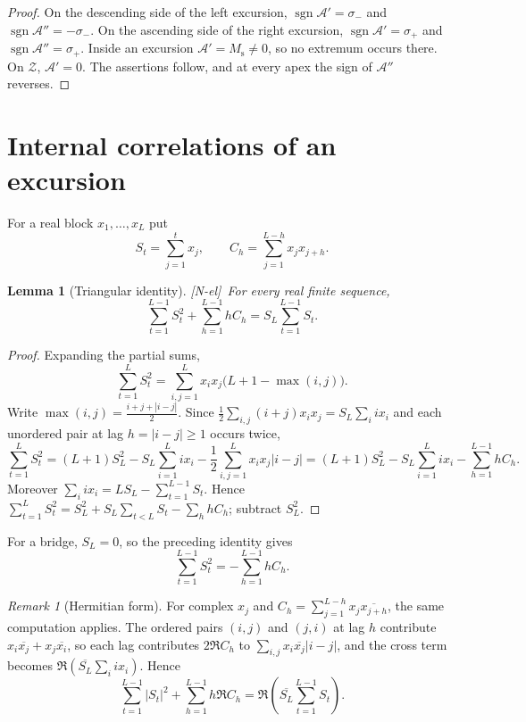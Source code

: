 \documentclass[11pt]{amsart}
\numberwithin{equation}{section}
\theoremstyle{plain}
\newtheorem{lemma}[theorem]{Lemma}
\theoremstyle{definition}
\theoremstyle{remark}
\newtheorem{remark}[theorem]{Remark}
\DeclareMathOperator{\sgn}{sgn}
\newcommand{\Ms}{M_{\mathrm{s}}}
\newcommand{\Anet}{\mathcal{A}}
\newcommand{\tagNE}{\textup{[N-el]}}
\begin{document}
\begin{proof}
On the descending side of the left excursion,
$\sgn\Anet'=\sigma_-$ and $\sgn\Anet''=-\sigma_-$. On the ascending side of
the right excursion, $\sgn\Anet'=\sigma_+$ and $\sgn\Anet''=\sigma_+$. Inside an excursion
$\Anet'=\Ms\ne0$, so no extremum occurs there. On
$\mathcal Z$, $\Anet'=0$. The assertions follow, and at every apex the sign of
$\Anet''$ reverses.
\end{proof}


\section{Internal correlations of an excursion}
\label{sec:internal_corr}

For a real block $x_1,\dots,x_L$ put
\begin{equation}
\label{eq:block_def}
S_t=\sum_{j=1}^t x_j,\qquad
C_h=\sum_{j=1}^{L-h}x_jx_{j+h}.
\end{equation}

\begin{lemma}[Triangular identity]
\label{lem:triangular-corr}
\tagNE\ For every real finite sequence,
\begin{equation}
\label{eq:general-triangular}
\sum_{t=1}^{L-1}S_t^2+\sum_{h=1}^{L-1}hC_h
=S_L\sum_{t=1}^{L-1}S_t.
\end{equation}
\end{lemma}

\begin{proof}
Expanding the partial sums,
\[
\sum_{t=1}^{L}S_t^2
=\sum_{i,j=1}^{L}x_ix_j\bigl(L+1-\max(i,j)\bigr).
\]
Write $\max(i,j)=\frac{i+j+|i-j|}{2}$. Since
$\frac12\sum_{i,j}(i+j)x_ix_j=S_L\sum_i ix_i$ and each unordered pair at
lag $h=|i-j|\ge1$ occurs twice,
\[
\sum_{t=1}^{L}S_t^2=(L+1)S_L^2-S_L\sum_{i=1}^{L}ix_i
-\frac12\sum_{i,j=1}^{L}x_ix_j|i-j|
=(L+1)S_L^2-S_L\sum_{i=1}^{L}ix_i-\sum_{h=1}^{L-1}hC_h .
\]
Moreover $\sum_i ix_i=LS_L-\sum_{t=1}^{L-1}S_t$.
Hence
$\sum_{t=1}^{L}S_t^2=S_L^2+S_L\sum_{t<L}S_t-\sum_hhC_h$; subtract $S_L^2$.
\end{proof}

For a bridge, $S_L=0$, so the preceding identity gives
\begin{equation}
\label{eq:bridge-triangular}
\sum_{t=1}^{L-1}S_t^2=-\sum_{h=1}^{L-1}hC_h.
\end{equation}

\begin{remark}[Hermitian form]
\label{rem:hermitian}
For complex $x_j$ and $C_h=\sum_{j=1}^{L-h}x_j\overline{x_{j+h}}$, the same
computation applies. The ordered pairs $(i,j)$ and $(j,i)$ at lag $h$
contribute $x_i\overline{x_j}+x_j\overline{x_i}$, so each lag contributes
$2\Re C_h$ to $\sum_{i,j}x_i\overline{x_j}|i-j|$, and the cross term
becomes $\Re(\overline{S_L}\sum_i ix_i)$. Hence
\[
\sum_{t=1}^{L-1}|S_t|^2+\sum_{h=1}^{L-1}h\Re C_h
=\Re\!\left(\overline{S_L}\sum_{t=1}^{L-1}S_t\right).
\]
\end{remark}
\end{document}
